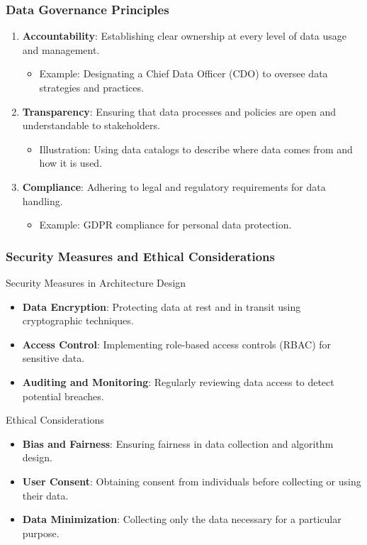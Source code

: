 \documentclass{beamer}
\begin{document}
\begin{frame}[fragile]
    \frametitle{Data Governance Principles}
    \begin{enumerate}
        \item \textbf{Accountability}: Establishing clear ownership at every level of data usage and management.
              \begin{itemize}
                  \item Example: Designating a Chief Data Officer (CDO) to oversee data strategies and practices.
              \end{itemize}
        \item \textbf{Transparency}: Ensuring that data processes and policies are open and understandable to stakeholders.
              \begin{itemize}
                  \item Illustration: Using data catalogs to describe where data comes from and how it is used.
              \end{itemize}
        \item \textbf{Compliance}: Adhering to legal and regulatory requirements for data handling.
              \begin{itemize}
                  \item Example: GDPR compliance for personal data protection.
              \end{itemize}
    \end{enumerate}
\end{frame}

\begin{frame}[fragile]
    \frametitle{Security Measures and Ethical Considerations}
    \begin{block}{Security Measures in Architecture Design}
        \begin{itemize}
            \item \textbf{Data Encryption}: Protecting data at rest and in transit using cryptographic techniques.
            \item \textbf{Access Control}: Implementing role-based access controls (RBAC) for sensitive data.
            \item \textbf{Auditing and Monitoring}: Regularly reviewing data access to detect potential breaches.
        \end{itemize}
    \end{block}
    \begin{block}{Ethical Considerations}
        \begin{itemize}
            \item \textbf{Bias and Fairness}: Ensuring fairness in data collection and algorithm design.
            \item \textbf{User Consent}: Obtaining consent from individuals before collecting or using their data.
            \item \textbf{Data Minimization}: Collecting only the data necessary for a particular purpose.
        \end{itemize}
    \end{block}
\end{frame}
\end{document}
